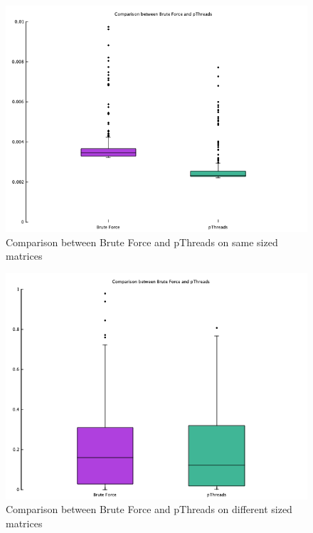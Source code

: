 \documentclass{article}
\begin{document}
\begin{figure}[h!]
\centering
\includegraphics[scale=0.4]{3.png}
\caption{Comparison between Brute Force and pThreads on same sized matrices}
\label{fig:3.png}
\end{figure}

\begin{figure}[h]
\centering
\includegraphics[scale=0.4]{4.png}
\caption{Comparison between Brute Force and pThreads on different sized matrices}
\label{fig:4.png}
\end{figure}
\end{document}
